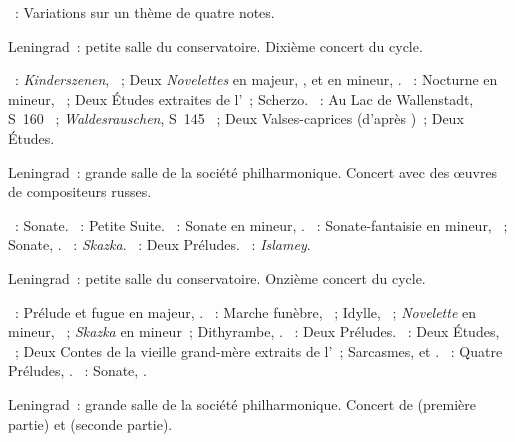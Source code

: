 \begin{description}
 \textsc{\Nikolaiev{}}~: Variations sur un thème de quatre notes.
 \item[\DateWithWeekDay{1938-04-23}]
 Leningrad~: petite salle du conservatoire.
 Dixième concert du cycle.

 \textsc{\Schumann{}}~: \emph{Kinderszenen}, ~; Deux
 \emph{Novelettes} en \kE majeur,  , et en \kF \Sharp
 mineur,  .
 \textsc{\Chopin{}}~: Nocturne en \kF \Sharp mineur,  ~;
 Deux Études extraites de l'~; Scherzo.
 \textsc{\Liszt{}}~: Au Lac de Wallenstadt, S~160 ~;
 \emph{Waldesrauschen}, S~145 ~; Deux Valses-caprices (d'après
 \Schubert{})~; Deux Études.
 \item[\DateWithWeekDay{1938-05-15}]
 Leningrad~: grande salle de la société philharmonique.
 Concert avec des œuvres de compositeurs russes.

 \textsc{\Bortnianski{}}~: Sonate.
 \textsc{\Borodine{}}~: Petite Suite.
 \textsc{\Glazounov{}}~: Sonate en \kB \Flat mineur, .
 \textsc{\Scriabine{}}~: Sonate-fantaisie en \kG \Sharp mineur, ~;
 Sonate, .
 \textsc{\Medtner{}}~: \emph{Skazka}.
 \textsc{\Rachmaninov{}}~: Deux Préludes.
 \textsc{\Balakirev{}}~: \emph{Islamey}.
 \item[\DateWithWeekDay{1938-05-18}]
 Leningrad~: petite salle du conservatoire.
 Onzième concert du cycle.

 \textsc{\Glazounov{}}~: Prélude et fugue en \kC majeur, .
 \textsc{\Medtner{}}~: Marche funèbre,  ~; Idylle,
  ~; \emph{Novelette} en \kC mineur, 
 ~; \emph{Skazka} en \kB mineur~; Dithyrambe, .
 \textsc{\Rachmaninov{}}~: Deux Préludes.
 \textsc{\Prokofiev{}}~: Deux Études, ~; Deux Contes de la vieille
 grand-mère extraits de l'~; Sarcasmes,   et
 .
 \textsc{\Chostakovitch{}}~: Quatre Préludes, .
 \textsc{\Scriabine{}}~: Sonate, .
 \item[\DateWithWeekDay{1938-05-24}]
 Leningrad~: grande salle de la société philharmonique.
 Concert de \VSlivinsky{} (première partie) et \VSofronitsky{} (seconde
 partie).


\end{description}
